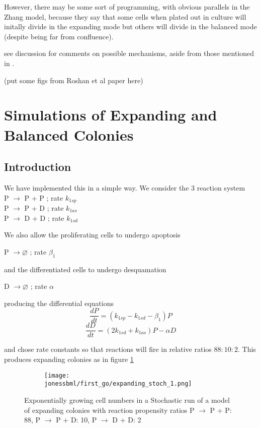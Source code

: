 \documentclass[a4paper,10pt]{report}
\newcommand{\psortbase}{/home/ngrs2/work/bsu/PSORT_Zuliani_Reynolds/}
\newcommand{\sbmlbase}{\psortbase/sbml-sh/}
\newcommand{\jonessbml}{\sbmlbase/jones_like}
\begin{document}
However, there may be some sort of programming, with obvious parallels in the Zhang model, because they say that some cells when plated out in culture will initally divide in the expanding mode but others will divide in the balanced mode (despite being far from confluence).

see discussion for comments on possible mechanisms, aside from those mentioned in \cite{roshan2016human}.

(put some figs from Roshan et al paper here) 

\section{Simulations of Expanding and Balanced Colonies}

\subsection{Introduction}
We have implemented this in a simple way. We consider the 3 reaction system \\
P $\rightarrow$ P + P ; rate $k_{1sp}$\\
P $\rightarrow$ P + D ; rate $k_{1as}$ \\
P $\rightarrow$ D + D ; rate $k_{1sd}$

We also allow the proliferating cells to undergo apoptosis 

P $\longrightarrow \varnothing$  ; rate $\beta_1$

and the differentiated cells to undergo desquamation

D $\longrightarrow \varnothing$  ; rate $\alpha$

producing the differential equations
\[
\frac{dP}{dt} = (k_{1sp} - k_{1sd} - \beta_1) P
\]
\[
\frac{dD}{dt} = (2 k_{1sd} + k_{1as}) P - \alpha D 
\]

and chose rate constants so that reactions will fire in relative ratios
$88:10:2$. This produces expanding colonies as in figure \ref{fig:joneslike_fixed_expand}


\begin{figure}[h!]
  \begin{subfigure}{\textwidth}
    \texttt{[image: \\jonessbml/first\_go/expanding\_stoch\_1.png]}
  \end{subfigure}
  \caption{Exponentially growing cell numbers in a Stochastic run of a model of expanding colonies with reaction propensity ratios P $\rightarrow$ P + P: 88, P $\rightarrow$ P + D: 10, P $\rightarrow$ D + D: 2}
  \label{fig:joneslike_fixed_expand}
\end{figure}
\end{document}
